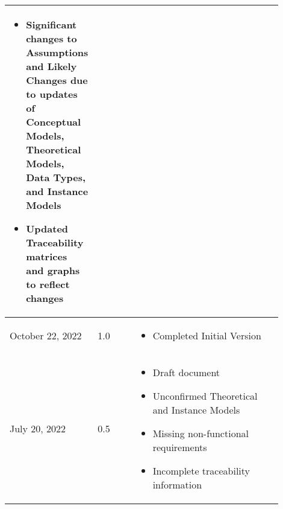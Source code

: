 \documentclass[11pt, titlepage]{article}
\makeatletter
\newcommand\newref[1]{#1\def\@currentlabel{#1}}
\makeatother
\begin{document}
\begin{center}
\begin{tabular}{m{0.17\linewidth}C{0.15\linewidth}m{0.58\linewidth}}
\begin{itemize}[noitemsep, nosep]
                \item Significant changes to Assumptions and Likely Changes due
                to updates of Conceptual Models, Theoretical Models, Data
                Types, and Instance Models

                \item Updated Traceability matrices and graphs to reflect
                changes
            \end{itemize} \\

            \midrule

             \vspace*{1mm}October 22, 2022 & \vspace*{1mm}\newref{1.0} &
             \vspace*{5mm}
             \begin{itemize}[noitemsep, nosep]
                 \item Completed Initial Version
             \end{itemize} \\

             \midrule

            \vspace*{1mm}July 20, 2022 & \vspace*{1mm}0.5 & \vspace*{5mm}
            \begin{itemize}[noitemsep, nosep]
                \item Draft document
                \item Unconfirmed Theoretical and Instance Models
                \item Missing non-functional requirements
                \item Incomplete traceability information
            \end{itemize} \\
            \bottomrule
        \end{tabular}
    \end{center}
    \vspace*{\fill}

    \clearpage

    \tableofcontents

    \clearpage

    \listoftables

    \listoffigures

    \clearpage

    
\end{document}
